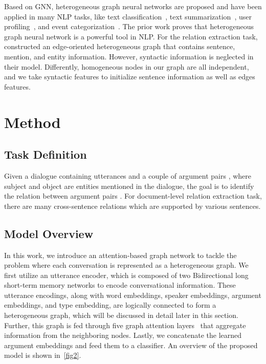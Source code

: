 \documentclass[11pt]{article}
\begin{document}
Based on GNN, heterogeneous graph neural networks are proposed and have been applied in many NLP tasks, like text classification~\cite{linmei2019heterogeneous}, text summarization~\cite{wang2020heterogeneous}, user profiling~\cite{chen2019semi}, and event categorization~\cite{peng2019fine}. The prior work proves that heterogeneous graph neural network is a powerful tool in NLP. For the relation extraction task, \citet{christopoulou2019connecting} constructed an edge-oriented heterogeneous graph that contains sentence, mention, and entity information. However, syntactic information is neglected in their model. Differently, homogeneous nodes in our graph are all independent, and we take syntactic features to initialize sentence information as well as edges features.

\section{Method}
\label{method}
\subsection{Task Definition}
Given a dialogue containing  utterances  and a couple of argument pairs , where subject  and object  are entities mentioned in the dialogue, the goal is to identify the relation between argument pairs . For document-level relation extraction task, there are many cross-sentence relations which are supported by various sentences.

\subsection{Model Overview}
In this work, we introduce an attention-based graph network to tackle the problem where each conversation is represented as a heterogeneous graph.
We first utilize an utterance encoder, which is composed of two  Bidirectional long short-term memory networks to encode conversational information.
These utterance encodings, along with word embeddings, speaker embeddings, argument embeddings, and type embedding, are logically connected to form a heterogeneous graph, which will be discussed in detail later in this section. Further, this graph is fed through five graph attention layers~\cite{velivckovic2017graph} that aggregate information from the neighboring nodes.
Lastly, we concatenate the learned argument embeddings and feed them to a classifier. An overview of the proposed model is shown in~\cref{fig2}.
\end{document}
